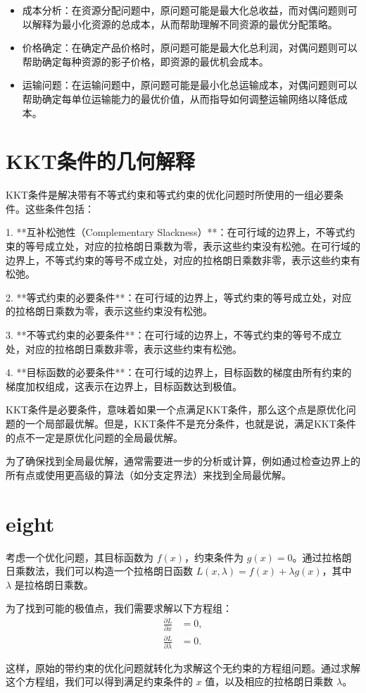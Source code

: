 \documentclass[12pt, a4paper, oneside]{ctexart}
\begin{document}
\begin{itemize}
  \item 成本分析：在资源分配问题中，原问题可能是最大化总收益，而对偶问题则可以解释为最小化资源的总成本，从而帮助理解不同资源的最优分配策略。
  \item 价格确定：在确定产品价格时，原问题可能是最大化总利润，对偶问题则可以帮助确定每种资源的影子价格，即资源的最优机会成本。
  \item 运输问题：在运输问题中，原问题可能是最小化总运输成本，对偶问题则可以帮助确定每单位运输能力的最优价值，从而指导如何调整运输网络以降低成本。
\end{itemize}
\section{KKT条件的几何解释}

KKT条件是解决带有不等式约束和等式约束的优化问题时所使用的一组必要条件。这些条件包括：

1. **互补松弛性（Complementary Slackness）**：在可行域的边界上，不等式约束的等号成立处，对应的拉格朗日乘数为零，表示这些约束没有松弛。在可行域的边界上，不等式约束的等号不成立处，对应的拉格朗日乘数非零，表示这些约束有松弛。

2. **等式约束的必要条件**：在可行域的边界上，等式约束的等号成立处，对应的拉格朗日乘数为零，表示这些约束没有松弛。

3. **不等式约束的必要条件**：在可行域的边界上，不等式约束的等号不成立处，对应的拉格朗日乘数非零，表示这些约束有松弛。

4. **目标函数的必要条件**：在可行域的边界上，目标函数的梯度由所有约束的梯度加权组成，这表示在边界上，目标函数达到极值。

KKT条件是必要条件，意味着如果一个点满足KKT条件，那么这个点是原优化问题的一个局部最优解。但是，KKT条件不是充分条件，也就是说，满足KKT条件的点不一定是原优化问题的全局最优解。

为了确保找到全局最优解，通常需要进一步的分析或计算，例如通过检查边界上的所有点或使用更高级的算法（如分支定界法）来找到全局最优解。

\section{eight}
考虑一个优化问题，其目标函数为 $f(x)$，约束条件为 $g(x) = 0$。通过拉格朗日乘数法，我们可以构造一个拉格朗日函数 $L(x, \lambda) = f(x) + \lambda g(x)$，其中 $\lambda$ 是拉格朗日乘数。

为了找到可能的极值点，我们需要求解以下方程组：
\begin{align*}
\frac{\partial L}{\partial x} &= 0, \\
\frac{\partial L}{\partial \lambda} &= 0.
\end{align*}

这样，原始的带约束的优化问题就转化为求解这个无约束的方程组问题。通过求解这个方程组，我们可以得到满足约束条件的 $x$ 值，以及相应的拉格朗日乘数 $\lambda$。
\end{document}
